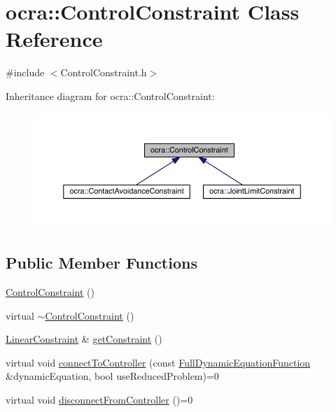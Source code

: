 \hypertarget{classocra_1_1ControlConstraint}{}\section{ocra\+:\+:Control\+Constraint Class Reference}
\label{classocra_1_1ControlConstraint}


{\ttfamily \#include $<$Control\+Constraint.\+h$>$}



Inheritance diagram for ocra\+:\+:Control\+Constraint\+:\nopagebreak
\begin{figure}[H]
\begin{center}
\leavevmode
\includegraphics[width=350pt]{de/dd8/classocra_1_1ControlConstraint__inherit__graph}
\end{center}
\end{figure}
\subsection*{Public Member Functions}
\begin{DoxyCompactItemize}
\item 
\hyperlink{classocra_1_1ControlConstraint_a3d911f350d6a51009b670dcf061ab93e}{Control\+Constraint} ()
\item 
virtual \hyperlink{classocra_1_1ControlConstraint_a49f1eb50f143ef0e438d3af43db9eb31}{$\sim$\+Control\+Constraint} ()
\item 
\hyperlink{namespaceocra_ae8b87cf4099be3efc3b410019ad2046e}{Linear\+Constraint} \& \hyperlink{classocra_1_1ControlConstraint_a41b7568bc59441ca8d115e7ccf613658}{get\+Constraint} ()
\item 
virtual void \hyperlink{classocra_1_1ControlConstraint_a04dabdc1c469146e7b3240dfe0a5172c}{connect\+To\+Controller} (const \hyperlink{classocra_1_1FullDynamicEquationFunction}{Full\+Dynamic\+Equation\+Function} \&dynamic\+Equation, bool use\+Reduced\+Problem)=0
\item 
virtual void \hyperlink{classocra_1_1ControlConstraint_adbd15b36773c775a06a0b7bde46ec799}{disconnect\+From\+Controller} ()=0
\end{DoxyCompactItemize}
